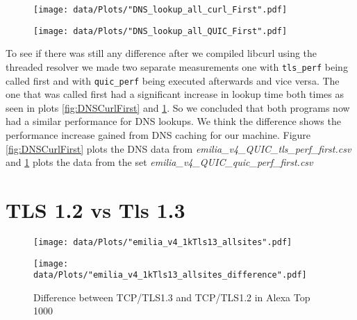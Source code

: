 \begin{figure}[!thb]
	\centering
	\begin{minipage}{.45\textwidth}
		\centering
		\texttt{[image: data/Plots/"DNS\_lookup\_all\_curl\_First".pdf]}
  		\label{fig:DNSCurlFirst}
  	\end{minipage}%
  	\hspace{0.5cm}
  	\begin{minipage}{.45\textwidth}
  		\centering 
  		\texttt{[image: data/Plots/"DNS\_lookup\_all\_QUIC\_First".pdf]}
  		\label{fig:DNSLSQUICFirst} 	
  	\end{minipage}
\end{figure}

To see if there was still any difference after we compiled libcurl using the threaded resolver we made two separate measurements one with \texttt{tls\_perf} being called first and with \texttt{quic\_perf} being executed afterwards and vice versa.
The one that was called first had a significant increase in lookup time both times as seen in plots \ref{fig:DNSCurlFirst} and \ref{fig:DNSLSQUICFirst}.
So we concluded that both programs now had a similar performance for DNS lookups.
We think the difference shows the performance increase gained from DNS caching for our machine. 
Figure \ref{fig:DNSCurlFirst} plots the DNS data from \textit{emilia\_v4\_QUIC\_tls\_perf\_first.csv} and \ref{fig:DNSLSQUICFirst} plots the data from the set \textit{emilia\_v4\_QUIC\_quic\_perf\_first.csv}

\section{TLS 1.2 vs Tls 1.3}
\label{section:TLS1_1.2_vs_Tls_1.3}

\begin{figure}[!thb]
	\centering
	\begin{minipage}{.45\textwidth}
		\centering
		\texttt{[image: data/Plots/"emilia\_v4\_1kTls13\_allsites".pdf]}
		\caption{Latency of 107 sites in Alexa Top 1000 that support TLS 1.3}
  		\label{fig:LatencyTLS13Top1k}
  	\end{minipage}%
  	\hspace{0.5cm}
  	\begin{minipage}{.45\textwidth}
  		\centering
  		\texttt{[image: data/Plots/"emilia\_v4\_1kTls13\_allsites\_difference".pdf]}
		\caption{Difference between TCP/TLS1.3 and TCP/TLS1.2 in Alexa Top 1000}
  		\label{fig:DiffTls13Tls12}
  	\end{minipage}
\end{figure}

